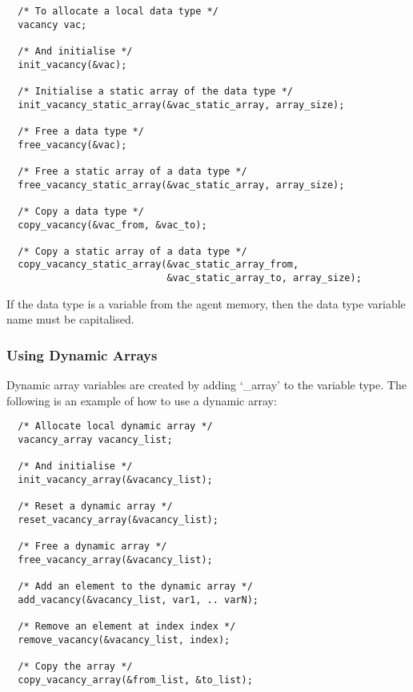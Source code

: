 \begin{verbatim}
  /* To allocate a local data type */
  vacancy vac;
  
  /* And initialise */
  init_vacancy(&vac);
  
  /* Initialise a static array of the data type */
  init_vacancy_static_array(&vac_static_array, array_size);
  
  /* Free a data type */
  free_vacancy(&vac);
  
  /* Free a static array of a data type */
  free_vacancy_static_array(&vac_static_array, array_size);
  
  /* Copy a data type */
  copy_vacancy(&vac_from, &vac_to);
  
  /* Copy a static array of a data type */
  copy_vacancy_static_array(&vac_static_array_from,
                            &vac_static_array_to, array_size);
  \end{verbatim}

If the data type is a variable from the agent memory, then the data type
variable name must be capitalised.

\subsubsection{Using Dynamic Arrays}

Dynamic array variables are created by adding `\_array' to the variable type.
The following is an example of how to use a dynamic array:

\begin{verbatim}
  /* Allocate local dynamic array */
  vacancy_array vacancy_list;

  /* And initialise */
  init_vacancy_array(&vacancy_list);
  
  /* Reset a dynamic array */
  reset_vacancy_array(&vacancy_list);
  
  /* Free a dynamic array */
  free_vacancy_array(&vacancy_list);
  
  /* Add an element to the dynamic array */
  add_vacancy(&vacancy_list, var1, .. varN);
  
  /* Remove an element at index index */
  remove_vacancy(&vacancy_list, index);
  
  /* Copy the array */
  copy_vacancy_array(&from_list, &to_list);
\end{verbatim}

